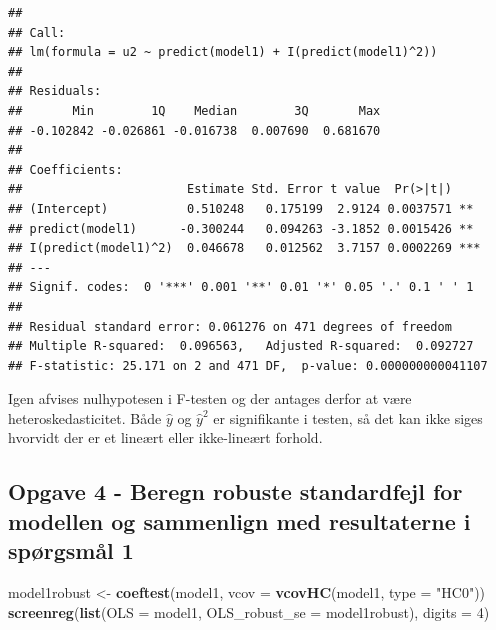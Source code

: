 \documentclass[
]{article}
\newenvironment{Shaded}{\begin{snugshade}}{\end{snugshade}}
\newcommand{\AttributeTok}[1]{\textcolor[rgb]{0.13,0.29,0.53}{#1}}
\newcommand{\DecValTok}[1]{\textcolor[rgb]{0.00,0.00,0.81}{#1}}
\newcommand{\FunctionTok}[1]{\textcolor[rgb]{0.13,0.29,0.53}{\textbf{#1}}}
\newcommand{\NormalTok}[1]{#1}
\newcommand{\OtherTok}[1]{\textcolor[rgb]{0.56,0.35,0.01}{#1}}
\newcommand{\StringTok}[1]{\textcolor[rgb]{0.31,0.60,0.02}{#1}}
\begin{document}
\begin{verbatim}
## 
## Call:
## lm(formula = u2 ~ predict(model1) + I(predict(model1)^2))
## 
## Residuals:
##       Min        1Q    Median        3Q       Max 
## -0.102842 -0.026861 -0.016738  0.007690  0.681670 
## 
## Coefficients:
##                       Estimate Std. Error t value  Pr(>|t|)    
## (Intercept)           0.510248   0.175199  2.9124 0.0037571 ** 
## predict(model1)      -0.300244   0.094263 -3.1852 0.0015426 ** 
## I(predict(model1)^2)  0.046678   0.012562  3.7157 0.0002269 ***
## ---
## Signif. codes:  0 '***' 0.001 '**' 0.01 '*' 0.05 '.' 0.1 ' ' 1
## 
## Residual standard error: 0.061276 on 471 degrees of freedom
## Multiple R-squared:  0.096563,   Adjusted R-squared:  0.092727 
## F-statistic: 25.171 on 2 and 471 DF,  p-value: 0.000000000041107
\end{verbatim}

Igen afvises nulhypotesen i F-testen og der antages derfor at være
heteroskedasticitet. Både \(\hat{y}\) og \(\hat{y}^2\) er signifikante i
testen, så det kan ikke siges hvorvidt der er et lineært eller
ikke-lineært forhold.

\hypertarget{opgave-4---beregn-robuste-standardfejl-for-modellen-og-sammenlign-med-resultaterne-i-spuxf8rgsmuxe5l-1}{%
\subsection{Opgave 4 - Beregn robuste standardfejl for modellen og
sammenlign med resultaterne i spørgsmål
1}\label{opgave-4---beregn-robuste-standardfejl-for-modellen-og-sammenlign-med-resultaterne-i-spuxf8rgsmuxe5l-1}}

\begin{Shaded}
\begin{Highlighting}[]
\NormalTok{model1robust }\OtherTok{\textless{}{-}} \FunctionTok{coeftest}\NormalTok{(model1, }\AttributeTok{vcov =} \FunctionTok{vcovHC}\NormalTok{(model1, }\AttributeTok{type =} \StringTok{"HC0"}\NormalTok{))}
\FunctionTok{screenreg}\NormalTok{(}\FunctionTok{list}\NormalTok{(}\AttributeTok{OLS =}\NormalTok{ model1, }\AttributeTok{OLS\_robust\_se =}\NormalTok{ model1robust), }\AttributeTok{digits =} \DecValTok{4}\NormalTok{)}
\end{Highlighting}
\end{Shaded}
\end{document}
